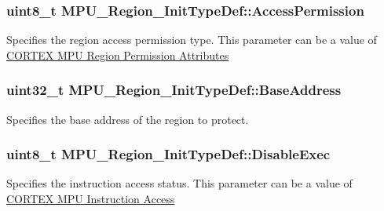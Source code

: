 \subsubsection[{\texorpdfstring{Access\+Permission}{AccessPermission}}]{\setlength{\rightskip}{0pt plus 5cm}uint8\+\_\+t M\+P\+U\+\_\+\+Region\+\_\+\+Init\+Type\+Def\+::\+Access\+Permission}\hypertarget{struct_m_p_u___region___init_type_def_a2906d8542359b67e1c871bbdebd82a3d}{}\label{struct_m_p_u___region___init_type_def_a2906d8542359b67e1c871bbdebd82a3d}
Specifies the region access permission type. This parameter can be a value of \hyperlink{group___c_o_r_t_e_x___m_p_u___region___permission___attributes}{C\+O\+R\+T\+EX M\+PU Region Permission Attributes} 
\subsubsection[{\texorpdfstring{Base\+Address}{BaseAddress}}]{\setlength{\rightskip}{0pt plus 5cm}uint32\+\_\+t M\+P\+U\+\_\+\+Region\+\_\+\+Init\+Type\+Def\+::\+Base\+Address}\hypertarget{struct_m_p_u___region___init_type_def_a92dc116f9695e89e028e783afbbf2916}{}\label{struct_m_p_u___region___init_type_def_a92dc116f9695e89e028e783afbbf2916}
Specifies the base address of the region to protect. 
\subsubsection[{\texorpdfstring{Disable\+Exec}{DisableExec}}]{\setlength{\rightskip}{0pt plus 5cm}uint8\+\_\+t M\+P\+U\+\_\+\+Region\+\_\+\+Init\+Type\+Def\+::\+Disable\+Exec}\hypertarget{struct_m_p_u___region___init_type_def_a63dde875f631cc442cbf95bd98f22bd5}{}\label{struct_m_p_u___region___init_type_def_a63dde875f631cc442cbf95bd98f22bd5}
Specifies the instruction access status. This parameter can be a value of \hyperlink{group___c_o_r_t_e_x___m_p_u___instruction___access}{C\+O\+R\+T\+EX M\+PU Instruction Access} 
